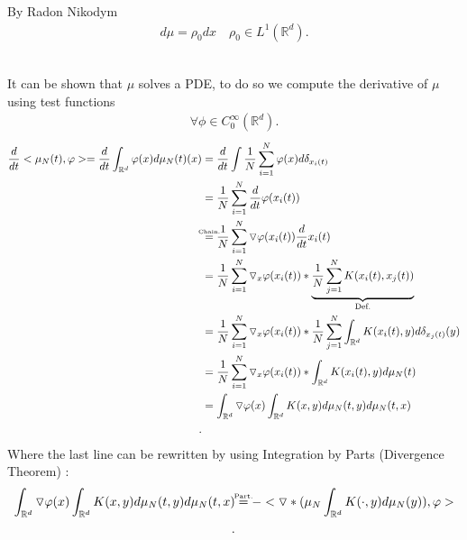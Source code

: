 \begin{corollary}
  By Radon Nikodym 
 \begin{align*}
  d\mu  = \rho_0 dx \quad \rho_0 \in  L^{1}(\mathbb{R}^{d} ) 
 .\end{align*}
\end{corollary}
\hspace{0mm}\\
It can be shown that $\mu $ solves a PDE, to do so we compute the derivative of $\mu $ using test functions
\begin{align*}
  \forall \phi \in  C_0^{\infty}(\mathbb{R}^{d} ) 
.\end{align*}
\begin{align*}
  \frac{d}{dt} <\mu_{N}(t),\phi> = \frac{d}{dt} \int_{\mathbb{R}^{d} } \phi(x) d\mu_{N}(t)(x) &= \frac{d}{dt} \int \frac{1}{N} \sum_{i=1}^{N} \phi(x) d \delta_{x_i(t)} \\
                                                                                              &= \frac{1}{N} \sum_{i=1}^{N} \frac{d}{dt} \phi(x_i(t)) \\
                                                                                              &\myS{Chain.}{=} \frac{1}{N} \sum_{i=1}^{N}  \triangledown \phi(x_{i}(t)) \frac{d}{dt} x_i(t)\\
                                                                                              &= \frac{1}{N} \sum_{i=1}^{N} \triangledown_x \phi(x_i(t)) * \underbrace{\frac{1}{N} \sum_{j=1}^{N} K(x_i(t),x_j(t))}_{\text{Def.}}   \\
                                                                                              &=  \frac{1}{N} \sum_{i=1}^{N} \triangledown_x \phi(x_i(t))* \frac{1}{N} \sum_{j=1}^{N} \int_{\mathbb{R}^{d } }K(x_i(t),y) d\delta_{x_j(t)}(y) \\
                                                                                              &=  \frac{1}{N} \sum_{i=1}^{N} \triangledown_x \phi(x_i(t))*  \int_{\mathbb{R}^{d } }K(x_i(t),y) d\mu_{N}(t) \\
                                                                                              &= \int_{\mathbb{R}^{d} } \triangledown \phi(x) \int_{\mathbb{R}^{d } } K(x,y) d\mu_{N}(t,y) d\mu_N(t,x)  \\
.\end{align*}
Where the last line can be rewritten by using Integration by Parts (Divergence Theorem) :
\begin{align*}
\int_{\mathbb{R}^{d} } \triangledown \phi(x) \int_{\mathbb{R}^{d } } K(x,y) d\mu_{N}(t,y) d\mu_N(t,x)  &\myS{Part.}{=} - <\triangledown*(\mu_N \int_{\mathbb{R}^{d }} K(\cdot,y)d\mu_{N}(y)),\phi> \\
.\end{align*}
